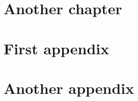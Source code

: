 \documentclass[12pt,oneside]{fithesis2}
\begin{document}
    \chapter{Another chapter}
    \Blindtext
    \appendix
    \chapter{First appendix}
    \Blindtext
    \chapter{Another appendix}
    \Blindtext
\end{document}
